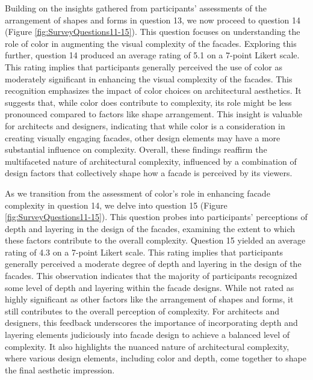 Building on the insights gathered from participants' assessments of the arrangement of shapes and forms in question 13, we now proceed to question 14 (Figure \ref{fig:SurveyQuestions11-15}). This question focuses on understanding the role of color in augmenting the visual complexity of the facades.
Exploring this further, question 14 produced an average rating of 5.1 on a 7-point Likert scale.
This rating implies that participants generally perceived the use of color as moderately significant in enhancing the visual complexity of the facades.
This recognition emphasizes the impact of color choices on architectural aesthetics.
It suggests that, while color does contribute to complexity, its role might be less pronounced compared to factors like shape arrangement.
This insight is valuable for architects and designers, indicating that while color is a consideration in creating visually engaging facades, other design elements may have a more substantial influence on complexity.
Overall, these findings reaffirm the multifaceted nature of architectural complexity, influenced by a combination of design factors that collectively shape how a facade is perceived by its viewers.


As we transition from the assessment of color's role in enhancing facade complexity in question 14, we delve into question 15 (Figure \ref{fig:SurveyQuestions11-15}). This question probes into participants' perceptions of depth and layering in the design of the facades, examining the extent to which these factors contribute to the overall complexity.
Question 15 yielded an average rating of 4.3 on a 7-point Likert scale.
This rating implies that participants generally perceived a moderate degree of depth and layering in the design of the facades.
This observation indicates that the majority of participants recognized some level of depth and layering within the facade designs.
While not rated as highly significant as other factors like the arrangement of shapes and forms, it still contributes to the overall perception of complexity.
For architects and designers, this feedback underscores the importance of incorporating depth and layering elements judiciously into facade design to achieve a balanced level of complexity.
It also highlights the nuanced nature of architectural complexity, where various design elements, including color and depth, come together to shape the final aesthetic impression.

